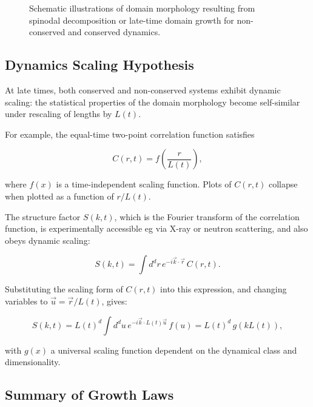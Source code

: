 \documentclass[
  letterpaper,
  enabledeprecatedfontcommands]{report}
\begin{document}
\begin{figure}
\begin{minipage}{0.50\linewidth}
\end{minipage}%

\caption{\label{fig-growth}Schematic illustrations of domain morphology
resulting from spinodal decomposition or late-time domain growth for
non-conserved and conserved dynamics.}

\end{figure}%

\subsection{Dynamics Scaling
Hypothesis}\label{dynamics-scaling-hypothesis}

At late times, both conserved and non-conserved systems exhibit dynamic
scaling: the statistical properties of the domain morphology become
self-similar under rescaling of lengths by \(L(t)\).

For example, the equal-time two-point correlation function satisfies

\[
C(r, t) = f\left(\frac{r}{L(t)}\right),
\]

where \(f(x)\) is a time-independent scaling function. Plots of
\(C(r, t)\) collapse when plotted as a function of \(r/L(t)\).

The structure factor \(S(k, t)\), which is the Fourier transform of the
correlation function, is experimentally accessible eg via X-ray or
neutron scattering, and also obeys dynamic scaling:

\[
S(k, t) = \int d^d r \, e^{-i \vec{k} \cdot \vec{r}} \, C(r, t).
\]

Substituting the scaling form of \(C(r, t)\) into this expression, and
changing variables to \(\vec{u} = \vec{r}/L(t)\), gives:

\[
S(k, t) = L(t)^d \int d^d u \, e^{-i \vec{k} \cdot L(t) \vec{u}} \, f(u) = L(t)^d \, g(kL(t)),
\]

with \(g(x)\) a universal scaling function dependent on the dynamical
class and dimensionality.

\subsection{Summary of Growth Laws}\label{summary-of-growth-laws}
\end{document}
